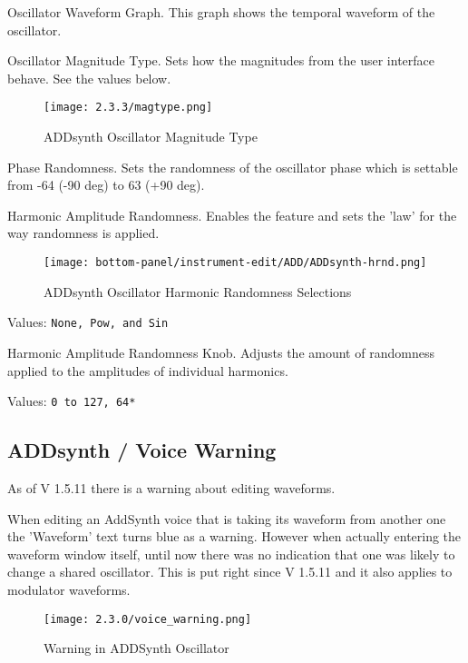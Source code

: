    Oscillator Waveform Graph.
   This graph shows the temporal waveform  of the oscillator.

   Oscillator Magnitude Type.
   Sets how the magnitudes from the user interface behave.  See the values
   below.

   \begin{figure}[H]
   \centering
   \texttt{[image: 2.3.3/magtype.png]}
   \caption{ADDsynth Oscillator Magnitude Type}
   \label{fig:addsynth_magtype}
\end{figure}

   Phase Randomness. Sets the randomness of the oscillator phase which is
   settable from -64 (-90 deg) to 63 (+90 deg).

   Harmonic Amplitude Randomness.
   Enables the feature and sets the 'law' for the way randomness is applied.

\begin{figure}[H]
   \centering
   \texttt{[image: bottom-panel/instrument-edit/ADD/ADDsynth-hrnd.png]}
   \caption{ADDsynth Oscillator Harmonic Randomness Selections}
   \label{fig:addsynth_hrnd}
\end{figure}

   Values: \texttt{None, Pow, and Sin}

   Harmonic Amplitude Randomness Knob.
   Adjusts the amount of randomness applied to the amplitudes of individual harmonics.

   Values: \texttt{0 to 127, 64*}

\subsection{ADDsynth / Voice Warning}
\label{subsec:addsynth_voice-warning}
   As of V 1.5.11 there is a warning about editing waveforms.

   When editing an AddSynth voice that is taking its waveform from another one
   the 'Waveform' text turns blue as a warning. However when actually entering
   the waveform window itself, until now there was no indication that one was
   likely to change a shared oscillator. This is put right since V 1.5.11 and
   it also applies to modulator waveforms.

\begin{figure}[H]
   \centering
   \texttt{[image: 2.3.0/voice\_warning.png]}
   \caption{Warning in ADDSynth Oscillator}
   \label{fig:voice_oscillator_warning}
\end{figure}

